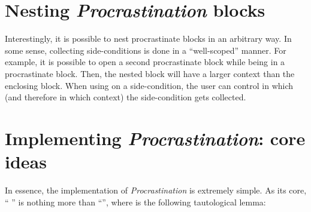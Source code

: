 \documentclass[xetex,format=acmlarge,screen=true,authorversion=true]{acmart-modified}
\begin{document}
\section{Nesting \emph{Procrastination} blocks}

Interestingly, it is possible to nest procrastinate blocks in an arbitrary way.
In some sense, collecting side-conditions is done in a ``well-scoped'' manner.
For example, it is possible to open a second procrastinate block while being in
a procrastinate block. Then, the nested block will have a larger context than
the enclosing block. When using  on a side-condition, the user
can control in which  (and therefore in which context) the
side-condition gets collected.




\section{Implementing \emph{Procrastination}: core ideas}

In essence, the implementation of \emph{Procrastination} is extremely simple. As
its core, `` '' is nothing more than
``'', where  is the following
tautological lemma:
\end{document}
